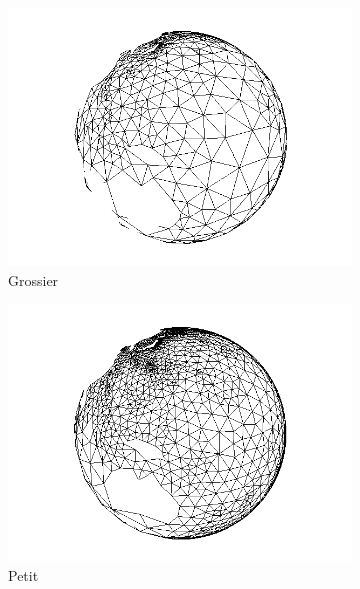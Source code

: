 \documentclass[a4paper,11pt]{article}
\begin{document}
\begin{figure}[H]
        \centering
        \begin{subfigure}[b]{0.3\textwidth}
                \centering
                \includegraphics[width=\textwidth]{TriTiny.png}
                \caption{Grossier}
                \label{fig:tiny}
        \end{subfigure}
        \begin{subfigure}[b]{0.3\textwidth}
                \centering
                \includegraphics[width=\textwidth]{TriSmall.png}
                \caption{Petit}
                \label{fig:small}
        \end{subfigure}
        \begin{subfigure}[b]{0.3\textwidth}

\end{subfigure}
\end{figure}
\end{document}

